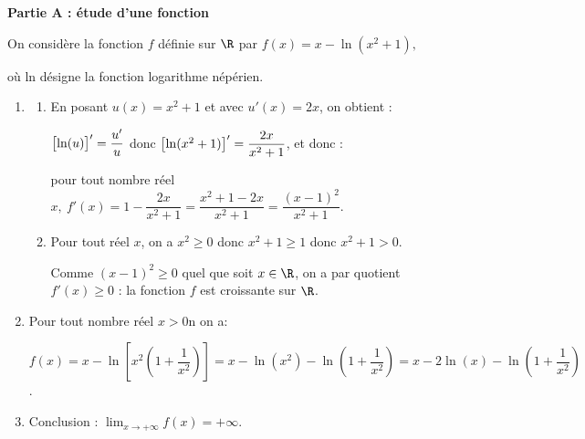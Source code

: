 \medskip

\begin{center}\textbf{Partie A : étude d'une fonction} \end{center}

On considère la fonction $f$ définie sur $\R$ par 
$f(x) = x - \ln \left(x^2 + 1\right),$

où ln désigne la fonction logarithme népérien.

\medskip

\begin{enumerate}
\item 
	\begin{enumerate}
		\item 
En posant $u(x) = x^2 + 1$ et avec $u'(x) = 2x$, on obtient :

$\left [\ln (u)\strut \right ]' = \dfrac{u'}{u}$ donc $\left [\ln (x^2+1)\strut \right ]' = \dfrac{2x}{x^2+ 1}$, et donc :

pour tout nombre réel $x, \: f'(x) = 1 - \dfrac{2x}{x^2+ 1} = \dfrac{x^2 + 1 - 2x}{x^2 + 1} =  \dfrac{(x - 1)^2}{ x^2 + 1}$.

		\item 
Pour tout réel $x$, on a $x^2 \geqslant 0$ donc $x^2 + 1\geqslant 1$ donc $x^2 + 1 > 0$.

Comme $(x - 1)^2 \geqslant 0$ quel que soit $x \in \R$, on a par quotient $f'(x) \geqslant 0$ : la fonction $f$ est croissante sur $\R$.
	\end{enumerate}
\item 

Pour tout nombre réel  $x > 0$n on a:

$f(x) =  x - \ln \left[x^2\left(1 + \dfrac{1}{x^2}\right)\right] = x - \ln (x^2) - \ln \left(1 + \dfrac{1}{x^2}\right) = x - 2 \ln(x) - \ln \left(1 + \dfrac{1}{x^2}\right)$. 

\item 
{}

Conclusion : $\displaystyle\lim_{x \to + \infty}f(x) = + \infty$.
\end{enumerate}

